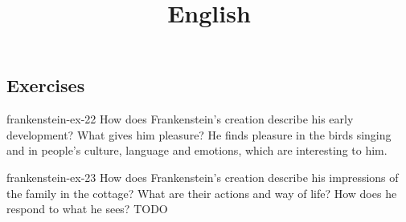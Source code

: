 \documentclass[preview]{standalone}
\begin{document}
\title{English}
\genpage

\subsection{Exercises}


\begin{snippetexercise}{frankenstein-ex-22}
    {How does Frankenstein's creation describe his early development? What gives him pleasure?}
    He finds pleasure in the birds singing and in people's culture, language
    and emotions, which are interesting to him.
\end{snippetexercise}

\begin{snippetexercise}{frankenstein-ex-23}
    {How does Frankenstein's creation describe his impressions of the family in the cottage? What are
    their actions and way of life? How does he respond to what he sees?}
    TODO 
\end{snippetexercise}
\end{document}
